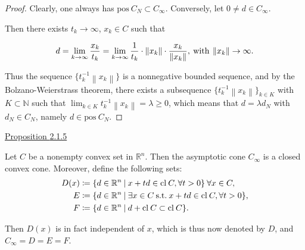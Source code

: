 \documentclass[a4paper,11pt]{jsarticle}
\newcommand{\PROPOSITION}[2]{\begin{itembox}[l]{\underline{Proposition {#1} }}{#2}\end{itembox}}
\newcommand{\NaturalNumberSet}{\mathbb{N}}
\newcommand{\NDemenstionalRealEuclidianSpace}{\mathbb{R}^n}
\newcommand{\SuchThat}{\:\text{s.t.}\:}
\begin{document}
\begin{proof}
  Clearly, one always has $\text{pos}\:C_N \subset C_{\infty}$. Conversely, let $0 \ne d \in C_{\infty}$.

  Then there exists $t_k \rightarrow \infty$, $x_k \in C$ such that

  \begin{equation}
    d = \lim_{k \to \infty} \frac{x_k}{t_k} = \lim_{k \to \infty} \frac{1}{t_k} \cdot \left\lVert x_k \right\rVert \cdot \frac{x_k}{\left\lVert x_k \right\rVert }, \:\text{with}\: \left\lVert x_k \right\rVert \rightarrow \infty. \notag
  \end{equation}

  Thus the sequence $\{t_k^{-1}\left\lVert x_k \right\rVert \}$ is a nonnegative bounded sequence, and by the Bolzano-Weierstrass theorem, there exists a subsequence $\{t_k^{-1}\left\lVert x_k \right\rVert\}_{k \in K}$ with $K \subset \NaturalNumberSet$ such that $\lim_{k \in K} t_k^{-1} \left\lVert x_k \right\rVert = \lambda \geq 0$, which means that $d = \lambda d_N$ with $d_N \in C_N$, namely $d \in \text{pos}\:C_N$.
\end{proof}

\PROPOSITION{2.1.5}{
  Let $C$ be a nonempty convex set in $\NDemenstionalRealEuclidianSpace$. Then the asymptotic cone $C_{\infty}$ is a closed convex cone. Moreover, define the following sets:
  \begin{equation}
    \begin{split}
      D(x) &\coloneqq \{d \in \NDemenstionalRealEuclidianSpace \:|\: x + td \in \text{cl}\:C, \forall t >0\}\: \forall x \in C, \\
      E &\coloneqq \{d \in \NDemenstionalRealEuclidianSpace \:|\: \exists x \in C \SuchThat x + td \in \text{cl}\:C, \forall t > 0\}, \\
      F &\coloneqq \{d \in \NDemenstionalRealEuclidianSpace \:|\: d + \text{cl}\:C \subset \text{cl}\:C\}. \notag
    \end{split}
  \end{equation}

  Then $D(x)$ is in fact independent of $x$, which is thus now denoted by $D$, and $C_{\infty} = D = E = F$.
}
\end{document}
